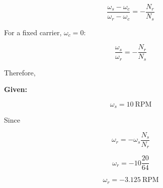 \documentclass{article}
\begin{document}
\begin{equation}
\frac{\omega_s-\omega_c}{\omega_r-\omega_c}
=
-\frac{N_r}{N_s}
\end{equation}

For a fixed carrier, $\omega_c=0$:

\begin{equation}
\frac{\omega_s}{\omega_r}
=
-\frac{N_r}{N_s}
\end{equation}

Therefore,

\textbf{Given:}

\begin{equation}
\omega_s = 10\ \mathrm{RPM}
\end{equation}

Since

\begin{equation}
\omega_r=-\omega_s\frac{N_s}{N_r}
\end{equation}

\begin{equation}
\omega_r=-10\frac{20}{64}
\end{equation}

\begin{equation}
\boxed{\omega_r=-3.125\ \mathrm{RPM}}
\end{equation}
\end{document}
